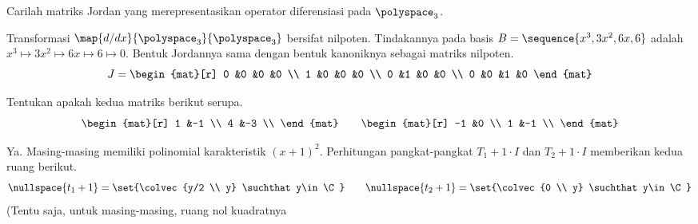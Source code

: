 \begin{exercises}
\begin{answer}
\begin{exparts}
      \end{exparts}  
     \end{answer}
  \recommended \item 
    Carilah matriks Jordan yang merepresentasikan operator diferensiasi
    pada \( \polyspace_3 \).
    \begin{answer}
      Transformasi $\map{d/dx}{\polyspace_3}{\polyspace_3}$
      bersifat nilpoten.
      Tindakannya pada basis \( B=\sequence{x^3,3x^2,6x,6} \)
      adalah $x^3\mapsto 3x^2\mapsto 6x\mapsto 6\mapsto 0$.
      Bentuk Jordannya sama dengan bentuk kanoniknya sebagai matriks nilpoten.
      \begin{equation*}
         J=
         \begin{mat}[r]
           0  &0  &0  &0  \\
           1  &0  &0  &0  \\
           0  &1  &0  &0  \\
           0  &0  &1  &0
         \end{mat}
      \end{equation*}
    \end{answer}
   \recommended \item 
      Tentukan apakah kedua matriks berikut serupa.
      \begin{equation*}
         \begin{mat}[r]
            1  &-1 \\
            4  &-3 \\
         \end{mat}
         \qquad
         \begin{mat}[r]
           -1  &0  \\
            1  &-1 \\
         \end{mat}
      \end{equation*}
      \begin{answer}
        Ya.
        Masing-masing memiliki polinomial karakteristik $(x+1)^2$.
        Perhitungan pangkat-pangkat $T_1+1\cdot I$ dan
        $T_2+1\cdot I$ memberikan kedua ruang berikut.
        \begin{equation*}
          \nullspace{t_1+1}=\set{\colvec{y/2 \\ y} \suchthat y\in\C}
          \qquad
          \nullspace{t_2+1}=\set{\colvec{0 \\ y} \suchthat y\in\C}
        \end{equation*}
        (Tentu saja, untuk masing-masing, ruang nol kuadratnya

\end{answer}
\end{exercises}
